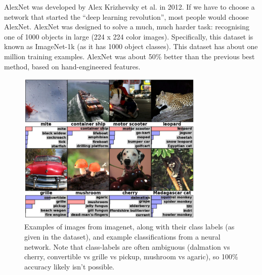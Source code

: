 \documentclass{article}
\begin{document}
AlexNet was developed by Alex Krizhevsky et al. in 2012.
If we have to choose a network that started the ``deep learning revolution'', most people would choose AlexNet.
AlexNet was designed to solve a much, much harder task: recognising one of 1000 objects in large (224 x 224 color images).
Specifically, this dataset is known as ImageNet-1k (as it has 1000 object classes).  
This dataset has about one million training examples.
AlexNet was about 50\% better than the previous best method, based on hand-engineered features.

\begin{figure}[H]
  \centering
  \includegraphics[width=0.8\textwidth]{imagenet}
  \caption{\label{fig:imagenet}
    Examples of images from imagenet, along with their class labels (as given in the dataset), and example classifications from a neural network.
    Note that class-labels are often ambiguous (dalmation vs cherry, convertible vs grille vs pickup, mushroom vs agaric), so 100\% accuracy likely isn't possible.
  }
\end{figure}
\end{document}
